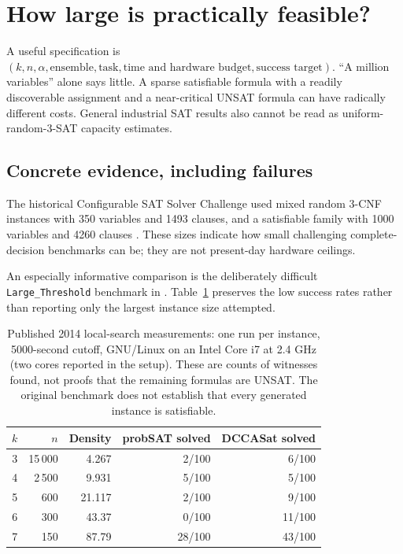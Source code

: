 \section{How large is practically feasible?}
\label{sec:scale}

A useful specification is $(k,n,\alpha,\text{ensemble},\text{task},
\text{time and hardware budget},\text{success target})$.
``A million variables'' alone says little. A sparse satisfiable formula
with a readily discoverable assignment and a near-critical UNSAT formula
can have radically different costs. General industrial SAT results also
cannot be read as uniform-random-$3$-SAT capacity estimates.

\subsection{Concrete evidence, including failures}
The historical Configurable SAT Solver Challenge used mixed random $3$-CNF
instances with 350 variables and 1493 clauses, and a satisfiable family with
1000 variables and 4260 clauses \citep[Appendix A.3]{hutter2017}. These
sizes indicate how small challenging complete-decision benchmarks can be;
they are not present-day hardware ceilings.

An especially informative comparison is the deliberately difficult
\texttt{Large\_Threshold} benchmark in \citet[Table 2]{luo2014}.
Table~\ref{tab:hardinstances} preserves the low success rates rather than
reporting only the largest instance size attempted.
\begin{table}[htbp]
\centering\small
\begin{tabular}{@{}rrrrr@{}}
\toprule
$k$ & $n$ & Density & probSAT solved & DCCASat solved \\
\midrule
3 & 15\,000 & 4.267 & 2/100 & 6/100 \\
4 & 2\,500 & 9.931 & 5/100 & 5/100 \\
5 & 600 & 21.117 & 2/100 & 9/100 \\
6 & 300 & 43.37 & 0/100 & 11/100 \\
7 & 150 & 87.79 & 28/100 & 43/100 \\
\bottomrule
\end{tabular}
\caption{Published 2014 local-search measurements: one run per instance,
5000-second cutoff, GNU/Linux on an Intel Core i7 at 2.4 GHz
(two cores reported in the setup). These are counts of witnesses found,
not proofs that the remaining formulas are UNSAT. The original benchmark
does not establish that every generated instance is satisfiable.}
\label{tab:hardinstances}
\end{table}

